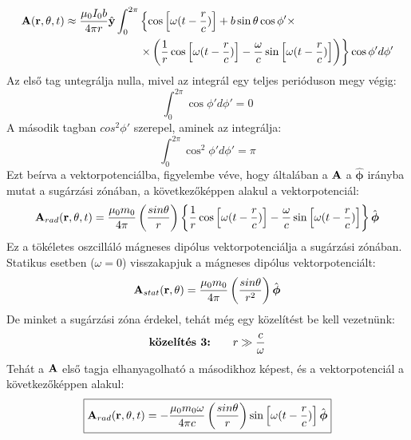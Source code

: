 \documentclass[../main.tex]{subfiles}
\begin{document}
\begin{equation}
    \begin{aligned}
        \bold{A}(\bold{r}, \theta, t) \approx \frac{\mu_0 I_0 b}{4 \pi r} \hat{\bold{y}} \int_0^{2 \pi} &\left\{\cos \left[\omega (t - \frac{r}{c}) \right] + b \sin \theta \cos \phi' \times \right. \\
        &\left. \times \left(\frac{1}{r} \cos \left[\omega (t - \frac{r}{c})\right]  - \frac{\omega}{c} \sin \left[\omega (t - \frac{r}{c})\right]\right) \right\} \cos \phi' d\phi'
    \end{aligned}
\end{equation}
Az első tag untegrálja nulla, mivel az integrál egy teljes perióduson megy végig:
\begin{equation}
    \int_0^{2 \pi} \cos \phi' d\phi' = 0
\end{equation}
A második tagban $cos^2 \phi'$ szerepel, aminek az integrálja:
\begin{equation}
    \int_0^{2 \pi} \cos^2 \phi' d\phi' = \pi
\end{equation}
Ezt beírva a vektorpotenciálba, figyelembe véve, hogy általában a $\bold{A}$ a $\hat{\boldsymbol{\phi}}$ irányba mutat a sugárzási zónában, a következőképpen alakul a vektorpotenciál:
\begin{equation}
    \bold{A}_{rad}(\bold{r}, \theta, t) = \frac{\mu_0 m_0}{4 \pi} \left(\frac{sin \theta}{r}\right) \left\{\frac{1}{r} \cos \left[\omega (t - \frac{r}{c})\right] - \frac{\omega}{c} \sin \left[\omega (t - \frac{r}{c})\right] \right\} \hat{\boldsymbol{\phi}}
\end{equation}
Ez a tökéletes oszcilláló mágneses dipólus vektorpotenciálja a sugárzási zónában. Statikus esetben ($\omega = 0$) visszakapjuk a mágneses dipólus vektorpotenciált:
\begin{equation}
    \bold{A}_{stat}(\bold{r}, \theta) = \frac{\mu_0 m_0}{4 \pi} \left(\frac{sin \theta}{r^2}\right) \hat{\boldsymbol{\phi}}
\end{equation}
De minket a sugárzási zóna érdekel, tehát még egy közelítést be kell vezetnünk:
\begin{equation}
    \text{\textbf{közelítés 3:}} \qquad r \gg \frac{c}{\omega}
\end{equation}
Tehát a $\bold{A}$ első tagja elhanyagolható a másodikhoz képest, és a vektorpotenciál a következőképpen alakul:
\begin{equation}
    \boxed{\bold{A}_{rad}(\bold{r}, \theta, t) = - \frac{\mu_0 m_0 \omega}{4 \pi c} \left(\frac{sin \theta}{r}\right) \sin \left[\omega (t - \frac{r}{c})\right] \hat{\boldsymbol{\phi}}}
\end{equation}
\end{document}
